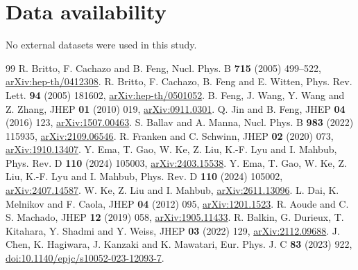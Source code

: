 \documentclass[11pt,a4paper]{article}
\begin{document}
\section*{Data availability}
No external datasets were used in this study.

\begingroup\small
\begin{thebibliography}{99}
\setlength{\itemsep}{0pt}
\setlength{\parsep}{0pt}
 R. Britto, F. Cachazo and B. Feng,
Nucl. Phys. B \textbf{715} (2005) 499--522,
\href{https://arxiv.org/abs/hep-th/0412308}{arXiv:hep-th/0412308}.
 R. Britto, F. Cachazo, B. Feng and E. Witten,
Phys. Rev. Lett. \textbf{94} (2005) 181602,
\href{https://arxiv.org/abs/hep-th/0501052}{arXiv:hep-th/0501052}.
 B. Feng, J. Wang, Y. Wang and Z. Zhang,
JHEP \textbf{01} (2010) 019,
\href{https://arxiv.org/abs/0911.0301}{arXiv:0911.0301}.
 Q. Jin and B. Feng, JHEP \textbf{04} (2016) 123,
\href{https://arxiv.org/abs/1507.00463}{arXiv:1507.00463}.
 S. Ballav and A. Manna, Nucl. Phys. B
\textbf{983} (2022) 115935,
\href{https://arxiv.org/abs/2109.06546}{arXiv:2109.06546}.
 R. Franken and C. Schwinn,
JHEP \textbf{02} (2020) 073,
\href{https://arxiv.org/abs/1910.13407}{arXiv:1910.13407}.
 Y. Ema, T. Gao, W. Ke, Z. Liu, K.-F. Lyu and I. Mahbub,
Phys. Rev. D \textbf{110} (2024) 105003,
\href{https://arxiv.org/abs/2403.15538}{arXiv:2403.15538}.
 Y. Ema, T. Gao, W. Ke, Z. Liu, K.-F. Lyu and I. Mahbub,
Phys. Rev. D \textbf{110} (2024) 105002,
\href{https://arxiv.org/abs/2407.14587}{arXiv:2407.14587}.
 W. Ke, Z. Liu and I. Mahbub,
\href{https://arxiv.org/abs/2611.13096}{arXiv:2611.13096}.
 L. Dai, K. Melnikov and F. Caola,
JHEP \textbf{04} (2012) 095,
\href{https://arxiv.org/abs/1201.1523}{arXiv:1201.1523}.
 R. Aoude and C. S. Machado,
JHEP \textbf{12} (2019) 058,
\href{https://arxiv.org/abs/1905.11433}{arXiv:1905.11433}.
 R. Balkin, G. Durieux, T. Kitahara, Y. Shadmi and
Y. Weiss, JHEP \textbf{03} (2022) 129,
\href{https://arxiv.org/abs/2112.09688}{arXiv:2112.09688}.
 J. Chen, K. Hagiwara, J. Kanzaki and K. Mawatari,
Eur. Phys. J. C \textbf{83} (2023) 922,
\href{https://doi.org/10.1140/epjc/s10052-023-12093-7}{doi:10.1140/epjc/s10052-023-12093-7}.

\end{thebibliography}
\end{document}
